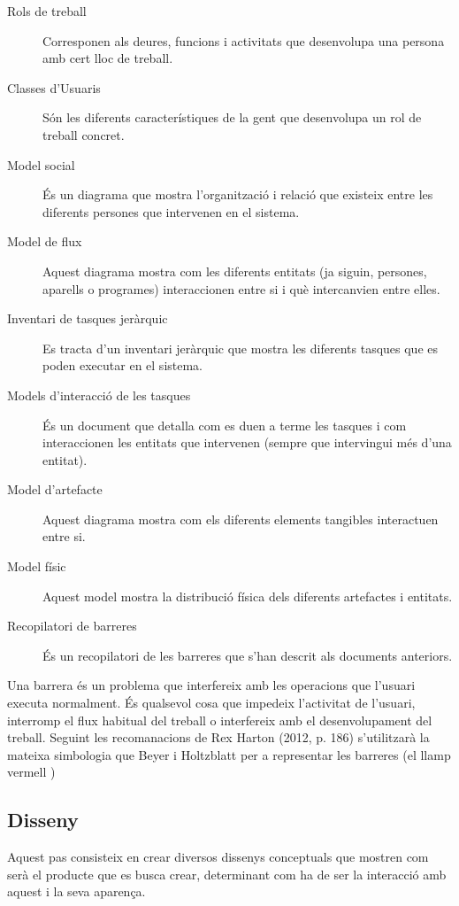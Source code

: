 \begin{description}
\item[Rols de treball] Corresponen als deures, funcions i activitats que desenvolupa una persona amb cert lloc de treball.
\item[Classes d'Usuaris] Són les diferents característiques de la gent que desenvolupa un rol de treball concret.
\item[Model social] És un diagrama que mostra l'organització i relació que existeix entre les diferents persones que intervenen en el sistema.
\item[Model de flux] Aquest diagrama mostra com les diferents entitats (ja siguin, persones, aparells o programes) interaccionen entre si i què intercanvien entre elles.
\item[Inventari de tasques jeràrquic] Es tracta d'un inventari jeràrquic que mostra les diferents tasques que es poden executar en el sistema.
\item[Models d'interacció de les tasques] És un document que detalla com es duen a terme les tasques i com interaccionen les entitats que intervenen (sempre que intervingui més d'una entitat).
\item[Model d'artefacte] Aquest diagrama mostra com els diferents elements tangibles interactuen entre si.
\item[Model físic] Aquest model mostra la distribució física dels diferents artefactes i entitats.
\item[Recopilatori de barreres] És un recopilatori de les barreres que s'han descrit als documents anteriors.
\end{description}

Una barrera és un problema que interfereix amb les operacions que l'usuari executa normalment. És qualsevol cosa que impedeix l'activitat de l'usuari, interromp el flux habitual del treball o interfereix amb el desenvolupament del treball. Seguint les recomanacions de Rex Harton (2012, p. 186) \cite{UX_Book} s'utilitzarà la mateixa simbologia que Beyer i Holtzblatt \cite{Contextual_Design} per a representar les barreres (el llamp vermell \barrier)

\subsection{Disseny}
Aquest pas consisteix en crear diversos dissenys conceptuals que mostren com serà el producte que es busca crear, determinant com ha de ser la interacció amb aquest i la seva aparença. 

